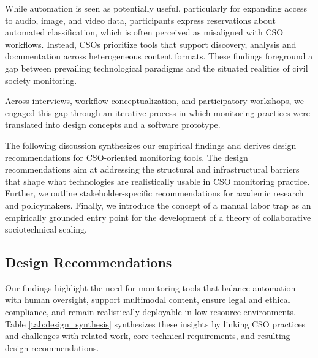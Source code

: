\documentclass[acmsmall]{acmart}
\begin{document}
While automation is seen as potentially useful, particularly for expanding access to audio, image, and video data, participants express reservations about automated classification, which is often perceived as misaligned with CSO workflows. Instead, CSOs prioritize tools that support discovery, analysis and documentation across heterogeneous content formats. 
These findings foreground a gap between prevailing technological paradigms and the situated realities of civil society monitoring.

Across interviews, workflow conceptualization, and participatory workshops, we engaged this gap through an iterative process in which monitoring practices were translated into design concepts and a software prototype.

The following discussion synthesizes our empirical findings and derives design recommendations for CSO-oriented monitoring tools. The design recommendations aim at addressing the structural and infrastructural barriers that shape what technologies are realistically usable in CSO monitoring practice. Further, we outline stakeholder-specific recommendations for academic research and policymakers. Finally, we introduce the concept of a manual labor trap as an empirically grounded entry point for the development of a theory of collaborative sociotechnical scaling.

\subsection{Design Recommendations}
\label{ssec:design_recommendations}
Our findings highlight the need for monitoring tools that balance automation with human oversight, support multimodal content, ensure legal and ethical compliance, and remain realistically deployable in low-resource environments. Table \ref{tab:design_synthesis} synthesizes these insights by linking CSO practices and challenges with related work, core technical requirements, and resulting design recommendations.
\end{document}
